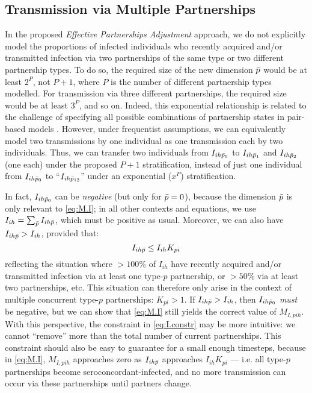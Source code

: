 \subsection{Transmission via Multiple Partnerships}\label{foi.prop.mp}
In the proposed \emph{Effective Partnerships Adjustment} approach,
we do not explicitly model the proportions of infected individuals
who recently acquired and/or transmitted infection via
two partnerships of the same type or two different partnership types.
To do so, the required size of the new dimension $\bar{p}$ would be at least $2^{P}$, not $P+1$,
where $P$ is the number of different partnership types modelled.
For transmission via three different partnerships,
the required size would be at least $3^{P}$, and so on.
Indeed, this exponential relationship is related to the challenge of specifying
all possible combinations of partnership states in pair-based models \cite{Kretzschmar2017}.
However, under frequentist assumptions, we can equivalently model
two transmissions by one individual as one transmission each by two individuals.
Thus, we can transfer two individuals from $I_{ih\bar{p}_0}$ to
$I_{ih\bar{p}_1}$ and $I_{ih\bar{p}_2}$ (one each) under the proposed $P+1$ stratification,
instead of just one individual from $I_{ih\bar{p}_0}$ to
``$I_{ih\bar{p}_{12}}$'' under an exponential ($x^P$) stratification.
\par
In fact, $I_{ih\bar{p}_0}$ can be \emph{negative} (but only for $\bar{p} = 0$),
because the dimension $\bar{p}$ is only relevant to \eqref{eq:M.I};
in all other contexts and equations,
we use $I_{ih} = \sum_{\bar{p}} I_{ih\bar{p}}$, which must be positive as usual.
Moreover, we can also have $I_{ih\bar{p}} > I_{ih}$, provided that:
\begin{equation}\label{eq:I.constr}
  I_{ih\bar{p}} \le I_{ih} K_{pi}
\end{equation}
reflecting the situation where $>100$\% of $I_{ih}$
have recently acquired and/or transmitted infection via at least one type-$p$ partnership,
or $>50$\% via at least two partnerships, etc.
This situation can therefore only arise in the context of
multiple concurrent type-$p$ partnerships: $K_{pi} > 1$.
If $I_{ih\bar{p}} > I_{ih}$, then $I_{ih\bar{p}_0}$ \emph{must} be negative,
but we can show that \eqref{eq:M.I} still yields the correct value of $M_{I,pih}$.
With this perspective, the constraint in \eqref{eq:I.constr} may be more intuitive:
we cannot ``remove'' more than the total number of current partnerships.
This constraint should also be easy to guarantee for a small enough timesteps,
because in \eqref{eq:M.I}, $M_{I,pih}$ approaches zero as $I_{ih\bar{p}}$ approaches $I_{ih} K_{pi}$
--- i.e. all type-$p$ partnerships become seroconcordant-infected,
and no more transmission can occur via these partnerships until partners change.
